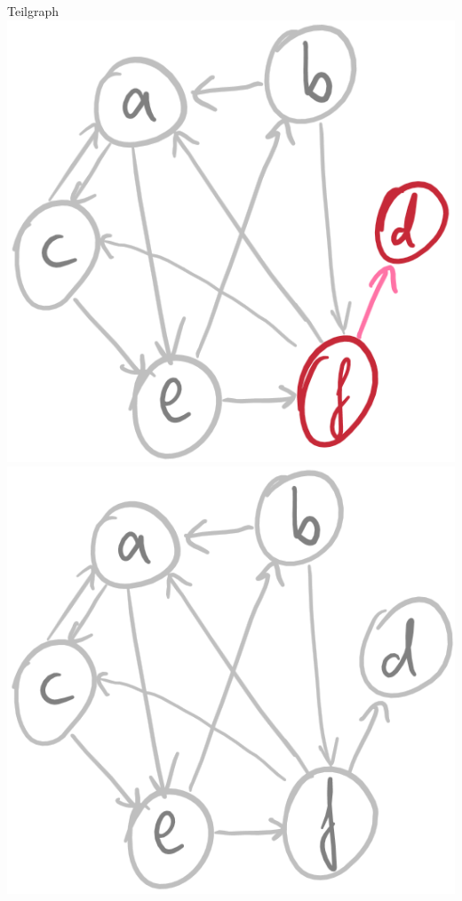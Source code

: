 \begin{frame}{Teilgraph}
	\includegraphics[scale=0.2]{images/graph_teilgraph_03.png}\ip
	\includegraphics[scale=0.2]{images/graph_teilgraph_01.png} %
\end{frame}

